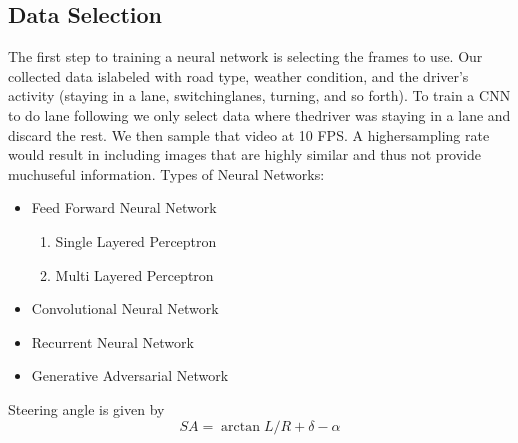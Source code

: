 \documentclass[a4paper]{IEEEtran}
\begin{document}
		\subsection{Data Selection}
		\label{subsec1}	
		The  first  step  to  training  a  neural  network  is  selecting  the  frames  to  use.   Our  collected  data  islabeled with road type,  weather condition,  and the driver’s activity (staying in a lane,  switchinglanes, turning, and so forth).  To train a CNN to do lane following we only select data where thedriver was staying in a lane and discard the rest.  We then sample that video at 10 FPS. A highersampling rate would result in including images that are highly similar and thus not provide muchuseful information.
		Types of Neural Networks:
		\begin{itemize}
			\item Feed Forward Neural Network
				\begin{enumerate}
					\item Single Layered Perceptron
					\item Multi Layered Perceptron
				\end{enumerate}
			\item Convolutional Neural Network
			\item Recurrent Neural Network
			\item Generative Adversarial Network
		\end{itemize}
		Steering angle is given by 
		\begin{equation}
		SA=	\arctan L/R + \delta - \alpha
		\end{equation}	
		\newpage
		
		
		
			
	
	
\end{document}
